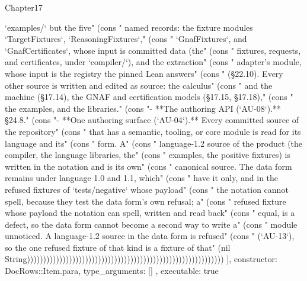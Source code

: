 \begin{lexlean}{Chapter17}
\begin{semanticmodule}
{{`examples/` but the five" (cons "  named records: the fixture modules `TargetFixtures`, `ReasoningFixtures`," (cons "  `GnafFixtures`, and `GnafCertificates`, whose input is committed data (the" (cons "  fixtures, requests, and certificates, under `compiler/`), and the extraction" (cons "  adapter's module, whose input is the registry the pinned Lean answers" (cons "  (§22.10). Every other source is written and edited as source: the calculus" (cons "  and the machine (§17.14), the GNAF and certification models (§17.15, §17.18)," (cons "  the examples, and the libraries." (cons "- **The authoring API (`AU-08`).** §24.8." (cons "- **One authoring surface (`AU-04`).** Every committed source of the repository" (cons "  that has a semantic, tooling, or core module is read for its language and its" (cons "  form. A" (cons "  language-1.2 source of the product (the compiler, the language libraries, the" (cons "  examples, the positive fixtures) is written in the notation and is its own" (cons "  canonical source. The data form remains under language 1.0 and 1.1, which" (cons "  have it only, and in the refused fixtures of `tests/negative` whose payload" (cons "  the notation cannot spell, because they test the data form's own refusal; a" (cons "  refused fixture whose payload the notation can spell, written and read back" (cons "  equal, is a defect, so the data form cannot become a second way to write a" (cons "  module unnoticed. A language-1.2 source in the data form is refused" (cons "  (`AU-13`), so the one refused fixture of that kind is a fixture of that" (nil String)))))))))))))))))))))))))))))))))))))))))))))))))))))))))))))
    ],
    constructor: DocRows::Item.para,
    type_arguments: []
  },
  executable: true
}


\end{semanticmodule}
\end{lexlean}
